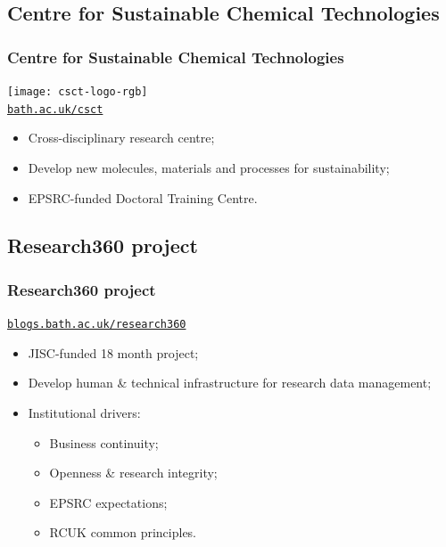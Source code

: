 \documentclass{beamer}
\newcommand{\shorturl}[2]%
  [?utm\_source=jsc\&utm\_medium=presentation\&utm\_campaign=ox\_open\_sci\_2012]%
  {\href{http://#2#1}{\nolinkurl{#2}}}
\begin{document}
\subsection{Centre for Sustainable Chemical Technologies}

\begin{frame}
  \frametitle{Centre for Sustainable Chemical Technologies}

  \begin{center}
    \texttt{[image: csct-logo-rgb]}\\
    \Large\shorturl{bath.ac.uk/csct}
  \end{center}
  
  \begin{itemize}
    \item Cross-disciplinary research centre;
    \item Develop new molecules, materials and processes for sustainability;
    \item EPSRC-funded Doctoral Training Centre.
  \end{itemize}
\end{frame}

\subsection{Research360 project}

\begin{frame}
  \frametitle{Research360 project}
  
  \begin{center}
    \Large\shorturl{blogs.bath.ac.uk/research360}
  \end{center}

  \begin{itemize}
    \item JISC-funded 18 month project;
    \item Develop human \& technical infrastructure for research data management;
    \item Institutional drivers:
      \begin{itemize}
        \item Business continuity;
        \item Openness \& research integrity;
        \item EPSRC expectations;
        \item RCUK common principles.
      \end{itemize}
  \end{itemize}
\end{frame}
\end{document}

